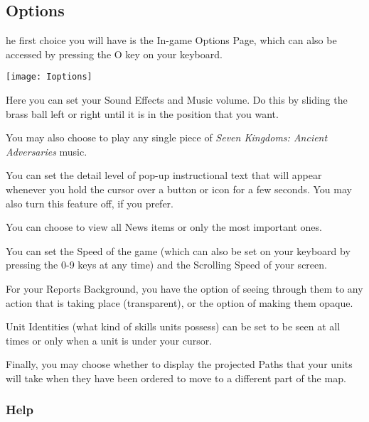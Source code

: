\subsection{\textsf{Options}}


he first choice you will have is the In-game Options Page, which can also be accessed by pressing the O key on your keyboard.

\begin{center}
    \texttt{[image: Ioptions]} %
\end{center}

Here you can set your Sound Effects and Music volume. Do this by sliding the brass ball left or right until it is in the position that you want.

You may also choose to play any single piece of \textit{Seven Kingdoms: Ancient Adversaries} music.


You can set the detail level of pop-up instructional text that will appear whenever you hold the cursor over a button or icon for a few seconds. You may also turn this feature off, if you prefer.

You can choose to view all News items or only the most important ones.


You can set the Speed of the game (which can also be set on your keyboard by pressing the 0-9 keys at any time) and the Scrolling Speed of your screen.

For your Reports Background, you have the option of seeing through them to any action that is taking place (transparent), or the option of making them opaque.

Unit Identities (what kind of skills units possess) can be set to be seen at all times or only when a unit is under your cursor.

Finally, you may choose whether to display the projected Paths that your units will take when they have been ordered to move to a different part of the map.

\subsubsection{\textsf{Help}}



